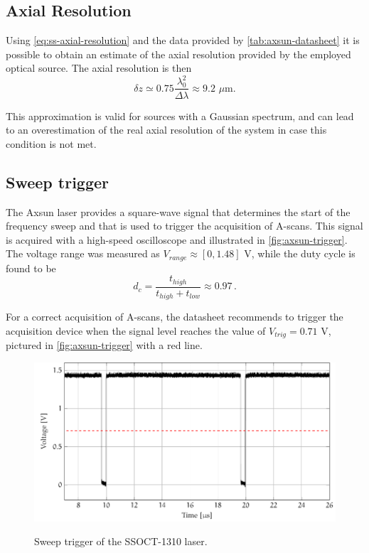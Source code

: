 \subsection{Axial Resolution}
Using \autoref{eq:ss-axial-resolution} and the data provided by \autoref{tab:axsun-datasheet} it is possible to obtain an estimate of the axial resolution provided by the employed optical source. The axial resolution is then
\begin{equation}
\delta z \simeq 0.75 \frac{\lambda_0^2}{\Delta \lambda} \approx 9.2 \,\, \mu\text{m.}
\end{equation}

This approximation is valid for sources with a Gaussian spectrum, and can lead to an overestimation of the real axial resolution of the system in case this condition is not met. 

\subsection{Sweep trigger}
The Axsun laser provides a square-wave signal that determines the start of the frequency sweep  and that is used to trigger the acquisition of A-scans. This signal is acquired with a high-speed oscilloscope and illustrated in \autoref{fig:axsun-trigger}. The voltage range was measured as $V_{range} \approx [0 ,1.48] $ V, while the duty cycle is found to be 
\begin{equation}
	d_c = \frac{t_{high}}{t_{high} + t_{low}} \approx 0.97\,.
\end{equation}

For a correct acquisition of A-scans, the datasheet recommends to trigger the acquisition device when the signal level reaches the value of $V_{trig} = 0.71$ V, pictured in \autoref{fig:axsun-trigger} with a red line. 


\begin{figure}[hbt]
	\myfloatalign
	{\includegraphics[width=0.8\linewidth]{gfx/ch3/trigger}}\\
	\caption{Sweep trigger of the SSOCT-1310 laser.}\label{fig:axsun-trigger}
\end{figure}

